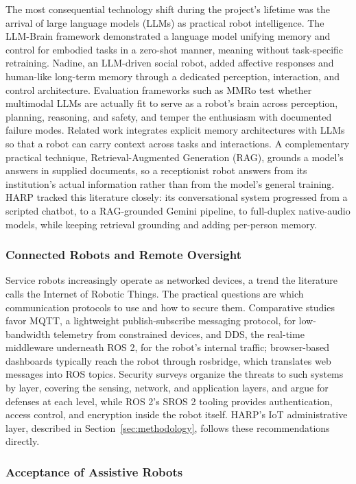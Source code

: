 \documentclass[11pt,a4paper]{article}
\begin{document}
The most consequential technology shift during the project's lifetime was the arrival of large language models (LLMs) as practical robot intelligence. The LLM-Brain framework demonstrated a language model unifying memory and control for embodied tasks in a zero-shot manner, meaning without task-specific retraining. Nadine, an LLM-driven social robot, added affective responses and human-like long-term memory through a dedicated perception, interaction, and control architecture. Evaluation frameworks such as MMRo test whether multimodal LLMs are actually fit to serve as a robot's brain across perception, planning, reasoning, and safety, and temper the enthusiasm with documented failure modes. Related work integrates explicit memory architectures with LLMs so that a robot can carry context across tasks and interactions. A complementary practical technique, Retrieval-Augmented Generation (RAG), grounds a model's answers in supplied documents, so a receptionist robot answers from its institution's actual information rather than from the model's general training. HARP tracked this literature closely: its conversational system progressed from a scripted chatbot, to a RAG-grounded Gemini pipeline, to full-duplex native-audio models, while keeping retrieval grounding and adding per-person memory.

\subsubsection{Connected Robots and Remote Oversight}

Service robots increasingly operate as networked devices, a trend the literature calls the Internet of Robotic Things. The practical questions are which communication protocols to use and how to secure them. Comparative studies favor MQTT, a lightweight publish-subscribe messaging protocol, for low-bandwidth telemetry from constrained devices, and DDS, the real-time middleware underneath ROS 2, for the robot's internal traffic; browser-based dashboards typically reach the robot through rosbridge, which translates web messages into ROS topics. Security surveys organize the threats to such systems by layer, covering the sensing, network, and application layers, and argue for defenses at each level, while ROS 2's SROS 2 tooling provides authentication, access control, and encryption inside the robot itself. HARP's IoT administrative layer, described in Section~\ref{sec:methodology}, follows these recommendations directly.

\subsubsection{Acceptance of Assistive Robots}
\end{document}

